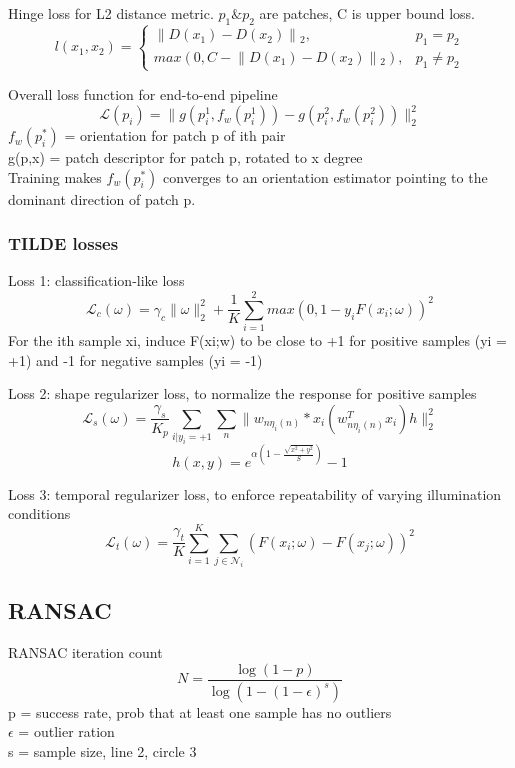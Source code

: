 Hinge loss for L2 distance metric. \(p_1 \text{\&} p_2\) are patches, C is upper bound
loss.
\[
    l(x_1,x_2) = 
    \begin{cases}
        \lVert D(x_1) - D(x_2) \rVert{}_2, & p_1=p_2 \\
        max(0, C - \lVert D(x_1) - D(x_2) \rVert{}_2), & p_1 \neq p_2
    \end{cases}
\]

Overall loss function for end-to-end pipeline
\[
    \mathcal{L}(p_i) = \lVert g(p_i^1, f_w(p_i^1)) -g(p_i^2, f_w(p_i^2))
    \rVert_2^2
\]
\(f_w(p_i^*)\) = orientation for patch p of ith pair \\
g(p,x) = patch descriptor for patch p, rotated to x degree \\
Training makes \(f_w(p_i^*)\) converges to an orientation estimator pointing to
the dominant direction of patch p.

\subsubsection{TILDE losses}

Loss 1: classification-like loss
\[
    \mathcal{L}_c(\omega) = \gamma_c \lVert\omega\rVert_2^2 + \frac{1}{K}
    \sum_{i=1}^2 max(0,1 -y_i F(x_i;\omega))^2
\]
For the ith sample xi, induce F(xi;w) to be close to +1 for positive samples
(yi = +1) and -1 for negative samples (yi = -1)

Loss 2: shape regularizer loss, to normalize the response for positive samples
\[
    \mathcal{L}_s(\omega) = \frac{\gamma_s}{K_p} \sum_{i\lvert y_i = +1} 
    \sum_{n} \lVert w_{n\eta_i(n)} * x_i (w_{n\eta_i(n)}^T x_i)h\rVert_2^2
\]
\[
    h(x,y) = e^{\alpha(1-\frac{\sqrt{x^2 + y^2}}{S})}-1
\]

Loss 3: temporal regularizer loss, to enforce repeatability of varying
illumination conditions
\[
    \mathcal{L}_t(\omega) = \frac{\gamma_t}{K} \sum_{i=1}^K
    \sum_{j\in\mathcal{N}_i} (F(x_i;\omega) - F(x_j;\omega))^2
\]

\subsection{RANSAC}

RANSAC iteration count
\[
    N = \frac{\log(1-p)}{\log(1-(1-\epsilon)^s)}
\]
p = success rate, prob that at least one sample has no outliers \\
\(\epsilon\) = outlier ration \\
s = sample size, line 2, circle 3

